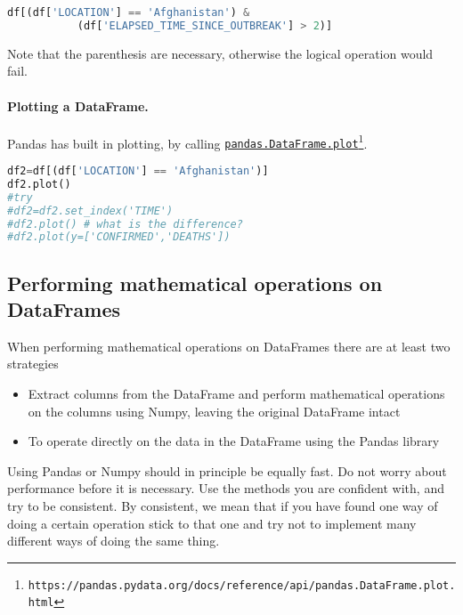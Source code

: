 \documentclass[graybox,sectrefs,envcountresetchap,open=right,final]{svmonodo}
\newenvironment{graybox2admon}[1][]{
\begin{graybox2mdframed}[frametitle=#1]
}
{
\end{graybox2mdframed}
}
\begin{document}
\begin{lstlisting}[language=python,style=blue1bar]
df[(df['LOCATION'] == 'Afghanistan') &
		   (df['ELAPSED_TIME_SINCE_OUTBREAK'] > 2)]

\end{lstlisting}

Note that the parenthesis are necessary, otherwise the logical operation would fail.

\paragraph{Plotting a DataFrame.}
Pandas has built in plotting, by calling \href{{https://pandas.pydata.org/docs/reference/api/pandas.DataFrame.plot.html}}{\nolinkurl{pandas.DataFrame.plot}\footnote{\texttt{https://pandas.pydata.org/docs/reference/api/pandas.DataFrame.plot.html}}}.







\begin{lstlisting}[language=python,style=blue1bar]
df2=df[(df['LOCATION'] == 'Afghanistan')]
df2.plot()
#try 
#df2=df2.set_index('TIME')
#df2.plot() # what is the difference?
#df2.plot(y=['CONFIRMED','DEATHS'])

\end{lstlisting}

\subsection{Performing mathematical operations on DataFrames}
When performing mathematical operations on DataFrames there are at least two strategies
\begin{itemize}
\item Extract columns from the DataFrame and perform mathematical operations on the columns using Numpy, leaving the original DataFrame intact

\item To operate directly on the data in the DataFrame using the Pandas library
\end{itemize}

\noindent


\begin{graybox2admon}[Speed and performance]
Using Pandas or Numpy should in principle be equally fast. Do not worry about performance before it is necessary. Use the methods you are confident with, and try to be consistent. By consistent, we mean that if you have found one way of doing a certain operation stick to that one and try not to implement many different ways of doing the same thing.
\end{graybox2admon}
\end{document}
